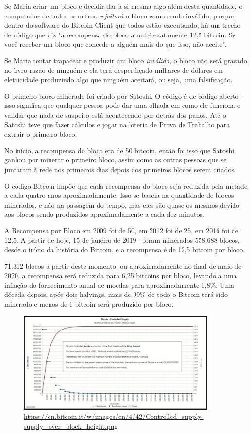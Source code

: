 Se Maria criar um bloco e decidir dar a si mesma algo além desta quantidade, o computador de todos os outros \textit{rejeitará} o bloco como sendo inválido, porque dentro do software do Bitcoin Client que todos estão executando, há um trecho de código que diz "a recompensa do bloco atual é exatamente 12,5 bitcoin. Se você receber um bloco que concede a alguém mais do que isso, não aceite”.

Se Maria tentar trapacear e produzir um bloco \textit{inválido}, o bloco não será gravado no livro-razão de ninguém e ela terá desperdiçado milhares de dólares em eletricidade produzindo algo que ninguém aceitará, ou seja, uma falsificação.

O primeiro bloco minerado foi criado por Satoshi. O código é de código aberto - isso significa que qualquer pessoa pode dar uma olhada em como ele funciona e validar que nada de suspeito está acontecendo por detrás dos panos. Até o Satoshi teve que fazer cálculos e jogar na loteria de Prova de Trabalho para extrair o primeiro bloco.

No início, a recompensa do bloco era de 50 bitcoin, então foi isso que Satoshi ganhou por minerar o primeiro bloco, assim como as outras pessoas que se juntaram à rede nos primeiros dias depois dos primeiros blocos serem criados.

O código Bitcoin impõe que cada recompensa do bloco seja reduzida pela metade a cada quatro anos aproximadamente. Isso se baseia na quantidade de blocos minerados, e não na passagem do tempo, mas eles são quase os mesmos devido aos blocos sendo produzidos aproximadamente a cada dez minutos.

A Recompensa por Bloco em 2009 foi de 50, em 2012 foi de 25, em 2016 foi de 12,5. A partir de hoje, 15 de janeiro de 2019 - foram minerados 558.688 blocos, desde o início da história do Bitcoin, e a recompensa é de 12,5 bitcoin por bloco.

71.312 blocos a partir deste momento, ou aproximadamente no final de maio de 2020, a recompensa será reduzida para 6,25 bitcoins por bloco, levando a uma inflação do fornecimento anual de moedas para aproximadamente 1,8\%. Uma década depois, após dois halvings, mais de 99\% de todo o Bitcoin terá sido minerado e menos de 1 bitcoin será produzido por bloco.

\begin{figure}
  \centering
  \includegraphics[width=10cm]{imagens/grafico-capitulo-05.jpg}
  \caption{\url{https://en.bitcoin.it/w/images/en/4/42/Controlled_supply-supply_over_block_height.png}}
\end{figure}


